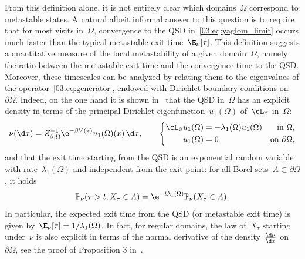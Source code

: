     From this definition alone, it is not entirely clear which domains~$\Omega$ correspond to metastable states.
    A natural albeit informal answer to this question is to require that for most visits in~$\Omega$, convergence to the QSD in~\eqref{03:eq:yaglom_limit} occurs much faster than the typical metastable exit time~$\E_\nu[\tau]$.
    This definition suggests a quantitative measure of the local metastability of a given domain~$\Omega$, namely the ratio between the metastable exit time and the convergence time to the QSD. Moreover, these timescales can be analyzed by relating them to the eigenvalues of the operator~\eqref{03:eq:generator}, endowed with Dirichlet boundary conditions on~$\partial\Omega$.
    Indeed, on the one hand it is shown in~\cite[Propositions 2 \& 3]{LBLLP12} that the QSD in~$\Omega$ has an explicit density in terms of the principal Dirichlet eigenfunction~$u_1(\Omega)$ of~$\cL_\beta$ in~$\Omega$:
    \begin{equation}
        \label{03:eq:qsd_spectral_link}
        \nu(\d x) = Z_{\beta,\Omega}^{-1}\e^{-\beta V(x)}u_{1}(\Omega)(x)\,\d x,\qquad\left\{\begin{aligned}\cL_\beta u_1(\Omega) &= -\lambda_1(\Omega)u_1(\Omega)&\text{ in $\Omega$}, \\ u_1(\Omega) &= 0&\text{on $\partial\Omega$},\end{aligned}\right.
    \end{equation}
    and that the exit time starting from the QSD is an exponential random variable with rate~$\lambda_1(\Omega)$ and independent from the exit point: for all Borel sets~$A\subset\partial\Omega$, it holds
    \begin{equation}
        \label{03:eq:exit_event}
        \mathbb P_\nu(\tau > t,X_{\tau}\in A) = \e^{-t\lambda_1(\Omega)}\mathbb P_\nu(X_\tau\in A).
    \end{equation}
    In particular, the expected exit time from the QSD (or metastable exit time) is given by~$\E_\nu[\tau] = 1/\lambda_1(\Omega)$.
    In fact, for regular domains, the law of~$X_\tau$ starting under~$\nu$ is also explicit in terms of the normal derivative of the density~$\frac{\d\nu}{\d x}$ on~$\partial\Omega$, see the proof of Proposition 3 in~\cite{LBLLP12}.
    
